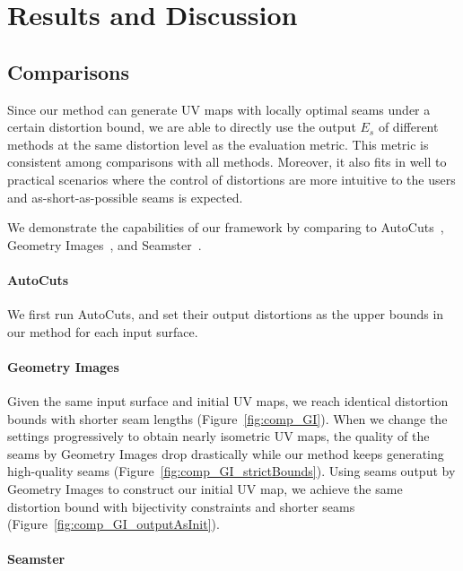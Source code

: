 
\section{Results and Discussion}
\label{sec:results}

\subsection{Comparisons}

Since our method can generate UV maps with locally optimal seams under a certain distortion bound, we are able to directly use the output $E_s$ of different methods at the same distortion level as the evaluation metric. This metric is consistent among comparisons with all methods. Moreover, it also fits in well to practical scenarios where the control of distortions are more intuitive to the users and as-short-as-possible seams is expected.

We demonstrate the capabilities of our framework by comparing to AutoCuts~\cite{Poranne2017Autocuts}, Geometry Images~\cite{Gu2002Geometry}, and Seamster~\cite{Sheffer2002Seamster}.


\paragraph{AutoCuts}
We first run AutoCuts, and set their output distortions as the upper bounds in our method for each input surface.

\paragraph{Geometry Images}
Given the same input surface and initial UV maps, we reach identical distortion bounds with shorter seam lengths (Figure~\ref{fig:comp_GI}).
When we change the settings progressively to obtain nearly isometric UV maps, the quality of the seams by Geometry Images drop drastically while our method keeps generating high-quality seams (Figure~\ref{fig:comp_GI_strictBounds}).
Using seams output by Geometry Images to construct our initial UV map, we achieve the same distortion bound with bijectivity constraints and shorter seams (Figure~\ref{fig:comp_GI_outputAsInit}).

\paragraph{Seamster}


